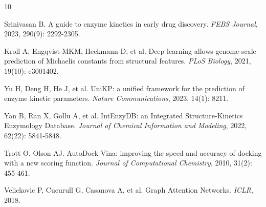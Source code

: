\documentclass[11pt, a4paper]{article}
\begin{document}

\begin{thebibliography}{10}

Srinivasan B. A guide to enzyme kinetics in early drug discovery. \textit{FEBS Journal}, 2023, 290(9): 2292-2305.

Kroll A, Engqvist MKM, Heckmann D, et al. Deep learning allows genome-scale prediction of Michaelis constants from structural features. \textit{PLoS Biology}, 2021, 19(10): e3001402.

Yu H, Deng H, He J, et al. UniKP: a unified framework for the prediction of enzyme kinetic parameters. \textit{Nature Communications}, 2023, 14(1): 8211.

Yan B, Ran X, Gollu A, et al. IntEnzyDB: an Integrated Structure-Kinetics Enzymology Database. \textit{Journal of Chemical Information and Modeling}, 2022, 62(22): 5841-5848.

Trott O, Olson AJ. AutoDock Vina: improving the speed and accuracy of docking with a new scoring function. \textit{Journal of Computational Chemistry}, 2010, 31(2): 455-461.

Velickovic P, Cucurull G, Casanova A, et al. Graph Attention Networks. \textit{ICLR}, 2018.

\end{thebibliography}
\end{document}
